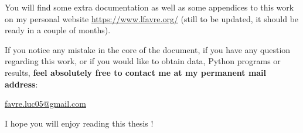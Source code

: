 \npar

\npar

You will find some extra documentation as well as some appendices to this work on my personal website \url{https://www.lfavre.org/} (still to be updated, it should be ready in a couple of months).

\npar

\npar

If you notice any mistake in the core of the document, if you have any question regarding this work, or if you would like to obtain data, Python programs or results, \textbf{feel absolutely free to contact me at my permanent mail address}:

\begin{center}
\large
\href{mailto:favre.luc05@gmail.com}{favre.luc05@gmail.com}
\end{center}


\npar

\npar

I hope you will enjoy reading this thesis ! {\Large{ \smiley{} }}

